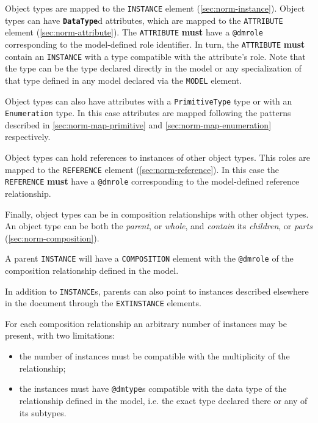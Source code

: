 \documentclass[11pt,a4paper]{ivoa}
\begin{document}
Object types are mapped to the \texttt{INSTANCE} element
(\ref{sec:norm-instance}). Object types can have
\textbf{\texttt{DataType}}d attributes, which are mapped to the
\texttt{ATTRIBUTE} element (\ref{sec:norm-attribute}). The
\texttt{ATTRIBUTE} \textbf{must} have a \texttt{@dmrole} corresponding
to the model-defined role identifier. In turn, the \texttt{ATTRIBUTE}
\textbf{must} contain an \texttt{INSTANCE} with a type compatible with
the attribute's role. Note that the type can be the type declared
directly in the model or any specialization of that type defined in any
model declared via the \texttt{MODEL} element.

Object types can also have attributes with a \texttt{PrimitiveType} type
or with an \texttt{Enumeration} type. In this case attributes are mapped
following the patterns described in \ref{sec:norm-map-primitive} and
\ref{sec:norm-map-enumeration} respectively.

Object types can hold references to instances of other object types.
This roles are mapped to the \texttt{REFERENCE} element
(\ref{sec:norm-reference}). In this case the \texttt{REFERENCE}
\textbf{must} have a \texttt{@dmrole} corresponding to the model-defined
reference relationship.

Finally, object types can be in composition relationships with other
object types. An object type can be both the \emph{parent}, or
\emph{whole}, and \emph{contain} its \emph{children}, or \emph{parts}
(\ref{sec:norm-composition}).

A parent \texttt{INSTANCE} will have a \texttt{COMPOSITION} element with
the \texttt{@dmrole} of the composition relationship defined in the
model.

In addition to \texttt{INSTANCE}s, parents can also point to instances
described elsewhere in the document through the \texttt{EXTINSTANCE}
elements.

For each composition relationship an arbitrary number of instances may
be present, with two limitations:

\begin{itemize}
\itemsep1pt\parskip0pt
\item
  the number of instances must be compatible with the multiplicity of
  the relationship;
\item
  the instances must have \texttt{@dmtype}s compatible with the data
  type of the relationship defined in the model, i.e. the exact type
  declared there or any of its subtypes.
\end{itemize}
\end{document}
